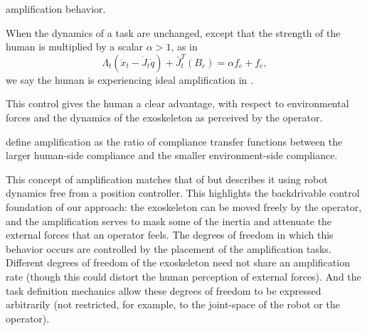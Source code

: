   amplification behavior.
\begin{definition}\label{def:ideal_amp}
	When the  dynamics of a task are unchanged, except that the strength of the human is multiplied by a scalar $\alpha>1$, as in
\begin{equation}
 \Lambda_t (\ddot x_t - \dot{J}_t \dot q) + \bar{J}_t^T (B_e) = \alpha f_c + f_e,\label{eq:ideal_amplification}
\end{equation}
we say the human is experiencing ideal amplification in .
\end{definition}%
This control gives the human a clear advantage, with respect to  environmental forces and the dynamics of the exoskeleton as perceived by the operator.

 define amplification as the ratio of compliance transfer functions between the larger human-side compliance and the smaller environment-side compliance. 


This concept of amplification matches that of \cite{KazerooniGuo1993JDSMC} but describes it using robot dynamics free from a position controller. This highlights the backdrivable control foundation of our approach: the exoskeleton can be moved freely by the operator, and the amplification serves to mask some of the inertia and attenuate the external forces that an operator feels. The degrees of freedom in which this behavior occurs are controlled by the placement of the amplification tasks. Different degrees of freedom of the exoskeleton need not share an amplification rate (though this could distort the human perception of external forces). And the task definition mechanics allow these degrees of freedom to be expressed arbitrarily (not restricted, for example, to the joint-space of the robot or the operator).

